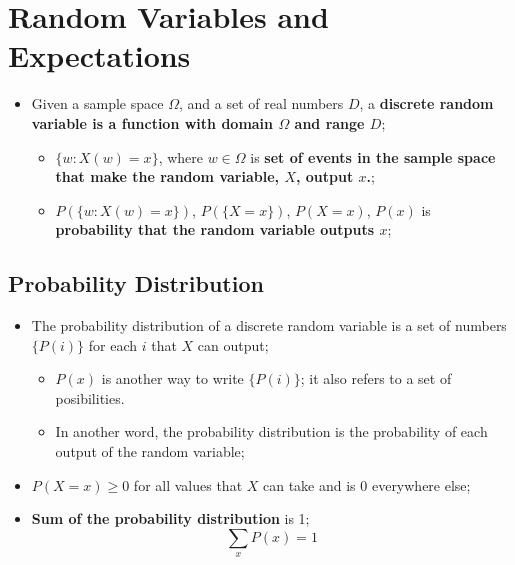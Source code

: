 \chapter{Random Variables and Expectations}

\begin{itemize}
  \item Given a sample space $ \Omega $, and a set of real numbers $ D $, a \textbf{discrete random variable is a function with domain $ \Omega $ and range $ D $};
  \begin{itemize}
    \item $ \{ w : X(w) = x \} $, where $ w \in \Omega $ is \textbf{set of events in the sample space that make the random variable, $ X $, output $ x $.};
    \item $ P \left(\{ w : X(w) = x \}\right) $, $ P \left(\{ X = x \}\right) $, $ P \left( X = x \right) $, $ P \left( x \right) $ is \textbf{probability that the random variable outputs $ x $};
  \end{itemize}
\end{itemize}

\section{Probability Distribution}

  \begin{itemize}
    \item The probability distribution of a discrete random variable is a set of numbers $ \{ P \left( i \right) \} $ for each $ i $ that $ X $ can output;
    \begin{itemize}
      \item $ P \left( x \right) $ is another way to write $ \{ P \left( i \right) \} $; it also refers to a set of posibilities.
      \item In another word, the probability distribution is the probability of each output of the random variable;
    \end{itemize}

    \item $ P(X = x) \geq 0 $ for all values that $ X $ can take and is 0 everywhere else;

    \item \textbf{Sum of the probability distribution} is 1;
    \begin{equation}
      \sum_{x} P (x) = 1
    \end{equation}
  \end{itemize}

